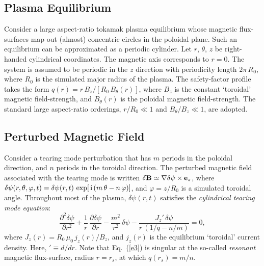 \documentclass[12pt,prb,aps]{revtex4-1}
\begin{document}
\subsection{Plasma Equilibrium}
Consider a large aspect-ratio tokamak plasma equilibrium whose magnetic flux-surfaces map out
(almost) concentric circles in the poloidal plane. Such an equilibrium can be approximated as a
periodic cylinder.\cite{rf1993} Let $r$, $\theta$, $z$ be right-handed cylindrical coordinates. 
The magnetic axis corresponds to $r=0$. The system is assumed to be periodic in the $z$
direction with periodicity length $2\pi\,R_0$, where $R_0$ is the simulated major radius of the plasma. The
safety-factor profile takes the form $q(r)=r\,B_z/[R_0\,B_\theta(r)]$, where $B_z$ is the constant
`toroidal' magnetic field-strength, and $B_\theta(r)$ is the poloidal magnetic field-strength. The standard
large aspect-ratio orderings, $r/R_0\ll 1$ and $B_\theta/B_z\ll 1$, are adopted. 

\subsection{Perturbed Magnetic Field}\label{cyl}
Consider a tearing mode perturbation that has $m$ periods in the poloidal direction, and
$n$ periods in the toroidal direction. 
The perturbed magnetic field associated with the tearing mode is written $\delta{\bf B} \simeq \nabla\delta\psi\times{\bf e}_z$,  
where
$\delta\psi(r,\theta,\varphi,t)= \delta\psi(r,t)\,\exp[\,{\rm i}\,(m\,\theta-n\,\varphi)]$, 
and $\varphi=z/R_0$ is a simulated toroidal angle. 
Throughout most of the plasma, $\delta\psi(r,t)$ satisfies the
{\em cylindrical tearing mode equation}:\cite{wes}
\begin{equation}\label{e3}
\frac{\partial^2\delta\psi}{\partial r^2} + \frac{1}{r}\,\frac{\partial\delta\psi}{\partial r}-\frac{m^2}{r^2}\,\delta\psi - \frac{J_z'\,\delta\psi}{r\,(1/q-n/m)}=  0,
\end{equation}
where 
$J_z(r)= R_0\,\mu_0\,j_z(r)/B_z$,
and $j_z(r)$ is the equilibrium `toroidal' current density. Here, $'\equiv d/dr$.  Note that Eq.~(\ref{e3}) is singular at the so-called {\em resonant}\/ magnetic flux-surface, radius $r=r_s$, at which 
$q(r_s)= m/n$. 
\end{document}
